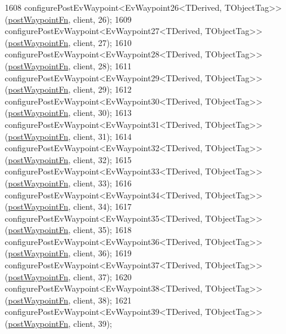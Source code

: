 \begin{DoxyCode}
1608     configurePostEvWaypoint<EvWaypoint26<TDerived, TObjectTag>>(\hyperlink{classcl__move__base__z_1_1WaypointEventDispatcher_a964a57fcce5d48ec60243230722d8dd7}{postWaypointFn}, client, 26);
1609     configurePostEvWaypoint<EvWaypoint27<TDerived, TObjectTag>>(\hyperlink{classcl__move__base__z_1_1WaypointEventDispatcher_a964a57fcce5d48ec60243230722d8dd7}{postWaypointFn}, client, 27);
1610     configurePostEvWaypoint<EvWaypoint28<TDerived, TObjectTag>>(\hyperlink{classcl__move__base__z_1_1WaypointEventDispatcher_a964a57fcce5d48ec60243230722d8dd7}{postWaypointFn}, client, 28);
1611     configurePostEvWaypoint<EvWaypoint29<TDerived, TObjectTag>>(\hyperlink{classcl__move__base__z_1_1WaypointEventDispatcher_a964a57fcce5d48ec60243230722d8dd7}{postWaypointFn}, client, 29);
1612     configurePostEvWaypoint<EvWaypoint30<TDerived, TObjectTag>>(\hyperlink{classcl__move__base__z_1_1WaypointEventDispatcher_a964a57fcce5d48ec60243230722d8dd7}{postWaypointFn}, client, 30);
1613     configurePostEvWaypoint<EvWaypoint31<TDerived, TObjectTag>>(\hyperlink{classcl__move__base__z_1_1WaypointEventDispatcher_a964a57fcce5d48ec60243230722d8dd7}{postWaypointFn}, client, 31);
1614     configurePostEvWaypoint<EvWaypoint32<TDerived, TObjectTag>>(\hyperlink{classcl__move__base__z_1_1WaypointEventDispatcher_a964a57fcce5d48ec60243230722d8dd7}{postWaypointFn}, client, 32);
1615     configurePostEvWaypoint<EvWaypoint33<TDerived, TObjectTag>>(\hyperlink{classcl__move__base__z_1_1WaypointEventDispatcher_a964a57fcce5d48ec60243230722d8dd7}{postWaypointFn}, client, 33);
1616     configurePostEvWaypoint<EvWaypoint34<TDerived, TObjectTag>>(\hyperlink{classcl__move__base__z_1_1WaypointEventDispatcher_a964a57fcce5d48ec60243230722d8dd7}{postWaypointFn}, client, 34);
1617     configurePostEvWaypoint<EvWaypoint35<TDerived, TObjectTag>>(\hyperlink{classcl__move__base__z_1_1WaypointEventDispatcher_a964a57fcce5d48ec60243230722d8dd7}{postWaypointFn}, client, 35);
1618     configurePostEvWaypoint<EvWaypoint36<TDerived, TObjectTag>>(\hyperlink{classcl__move__base__z_1_1WaypointEventDispatcher_a964a57fcce5d48ec60243230722d8dd7}{postWaypointFn}, client, 36);
1619     configurePostEvWaypoint<EvWaypoint37<TDerived, TObjectTag>>(\hyperlink{classcl__move__base__z_1_1WaypointEventDispatcher_a964a57fcce5d48ec60243230722d8dd7}{postWaypointFn}, client, 37);
1620     configurePostEvWaypoint<EvWaypoint38<TDerived, TObjectTag>>(\hyperlink{classcl__move__base__z_1_1WaypointEventDispatcher_a964a57fcce5d48ec60243230722d8dd7}{postWaypointFn}, client, 38);
1621     configurePostEvWaypoint<EvWaypoint39<TDerived, TObjectTag>>(\hyperlink{classcl__move__base__z_1_1WaypointEventDispatcher_a964a57fcce5d48ec60243230722d8dd7}{postWaypointFn}, client, 39);

\end{DoxyCode}
